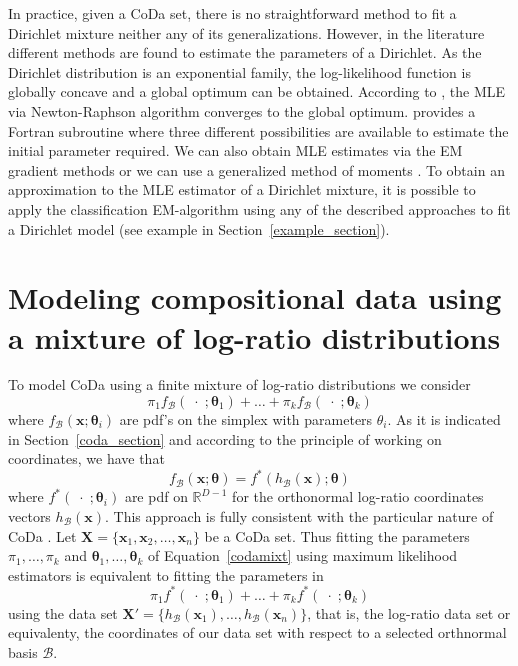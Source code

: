 \documentclass[12pt, a4paper]{article}
\newcommand{\m}[1]{\boldsymbol{#1}}
\begin{document}
In practice, given a CoDa set, there is no straightforward method to fit a Dirichlet mixture neither any of its generalizations. However, in the literature different methods are found to estimate the parameters of a Dirichlet. As the Dirichlet distribution is an exponential family, the log-likelihood function is globally concave and a global optimum can be obtained. According to \cite{ng2011dirichlet}, the MLE via Newton-Raphson algorithm converges to the global optimum. \cite{narayanan1991algorithm} provides a Fortran subroutine where three different possibilities are available to estimate the initial parameter required.
We can also obtain MLE estimates via the EM gradient methods \citep{ng2011dirichlet} or we can use a generalized method of moments
\citep{hansen1982large}.  
To obtain an approximation to the MLE estimator of a Dirichlet mixture, it is possible to apply the classification EM-algorithm \citep{celeux1992classification} using any of the described approaches to fit a Dirichlet model (see example in Section~\ref{example_section}).



\section{Modeling compositional data using a mixture of log-ratio distributions}
\label{codamix_section}

\noindent To model CoDa using a finite mixture of log-ratio distributions we consider 
\begin{equation}
\pi_1 f_\mathcal{B}(\;\cdot\; ; \m\theta_1) + \dots + \pi_k f_\mathcal{B}(\;\cdot\; ; \m\theta_k)
\label{codamixt}
\end{equation}
where $f_\mathcal{B}(\textbf{x} ; \m\theta_i)$ are pdf's on the simplex with parameters $\theta_i$. As it is indicated in Section~\ref{coda_section} and according to the principle of working on coordinates, we have that
\[f_\mathcal{B}(\textbf{x} ; \m\theta) = f^*(h_\mathcal{B}(\textbf{x}) ; \m\theta)\]
where $f^*(\;\cdot\; ; \m\theta_i)$ are pdf on $\mathbb{R}^{D-1}$ for the orthonormal log-ratio coordinates vectors $h_\mathcal{B}(\textbf{x})$. This approach is fully consistent with the particular nature of CoDa \citep{aitchison1986statistical}. Let $\mathbf{X} =  \{ \textbf{x}_1, \textbf{x}_2, \dots , \textbf{x}_n \}$ be a CoDa set. 
Thus fitting the parameters $\pi_1, \dots, \pi_k$ and $\m\theta_1, \dots, \m\theta_k$ of Equation~\ref{codamixt} using maximum likelihood estimators is equivalent to fitting the parameters in
\begin{equation}
\pi_1 f^*(\;\cdot\; ; \m\theta_1) + \dots + \pi_k f^*(\;\cdot\; ; \m\theta_k)
\label{coordmixt}
\end{equation}
using the data set $\mathbf{X}' = \{ h_\mathcal{B}(\mathbf{x}_1), \dots, h_\mathcal{B}(\mathbf{x}_n) \}$, that is, the log-ratio data set or equivalenty, the coordinates of our data set with respect to a selected orthnormal basis $\mathcal{B}$.
\end{document}
